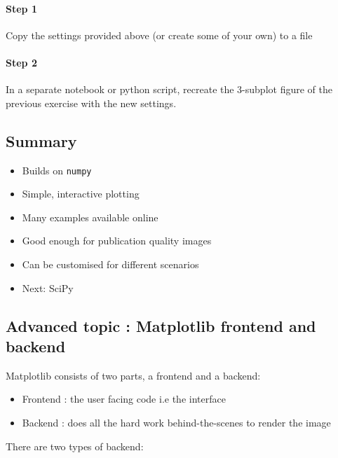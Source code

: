 \documentclass[11pt]{article}
\providecommand{\tightlist}{%
      \setlength{\itemsep}{0pt}\setlength{\parskip}{0pt}}
\begin{document}
\paragraph{Step 1}\label{step-1}

Copy the settings provided above (or create some of your own) to a file

\paragraph{Step 2}\label{step-2}

In a separate notebook or python script, recreate the 3-subplot figure
of the previous exercise with the new settings.

    \subsection{Summary}\label{summary}

\begin{itemize}
\item
  Builds on \texttt{numpy}
\item
  Simple, interactive plotting
\item
  Many examples available online
\item
  Good enough for publication quality images
\item
  Can be customised for different scenarios
\end{itemize}

\begin{itemize}
\tightlist
\item
  Next: SciPy
\end{itemize}

    \subsection{Advanced topic : Matplotlib frontend and
backend}\label{advanced-topic-matplotlib-frontend-and-backend}

Matplotlib consists of two parts, a frontend and a backend:

\begin{itemize}
\tightlist
\item
  Frontend : the user facing code i.e the interface
\item
  Backend : does all the hard work behind-the-scenes to render the image
\end{itemize}

There are two types of backend:
\end{document}
